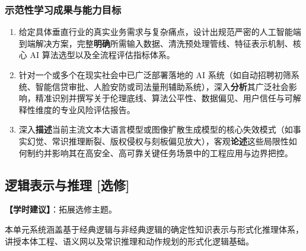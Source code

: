 \subsubsection{示范性学习成果与能力目标}
\begin{enumerate}
    \item 给定具体垂直行业的真实业务需求与复杂痛点，设计出规范严密的人工智能端到端解决方案，完整\textbf{明确}所需输入数据、清洗预处理管线、特征表示机制、核心 AI 算法选型以及全流程评估指标体系。
    \item 针对一个或多个在现实社会中已广泛部署落地的 AI 系统（如自动招聘初筛系统、智能信贷审批、人脸安防或司法量刑辅助系统），深入\textbf{分析}其广泛社会影响，精准识别并撰写关于伦理底线、算法公平性、数据偏见、用户信任与可解释性维度的专业风险评估报告。
    \item 深入\textbf{描述}当前主流文本大语言模型或图像扩散生成模型的核心失效模式（如事实幻觉、常识推理断裂、版权侵权与刻板偏见放大），客观\textbf{论述}这些局限性如何制约并影响其在高安全、高可靠关键任务场景中的工程应用与边界把控。
\end{enumerate}

\subsection{逻辑表示与推理 [选修]}
\textbf{【学时建议】}：拓展选修主题。

本单元系统涵盖基于经典逻辑与非经典逻辑的确定性知识表示与形式化推理体系，讲授本体工程、语义网以及常识推理和动作规划的形式化逻辑基础。

